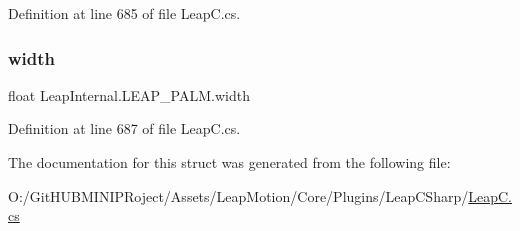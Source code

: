 Definition at line 685 of file Leap\+C.\+cs.

\mbox{\label{struct_leap_internal_1_1_l_e_a_p___p_a_l_m_a47601024191a5adf43568ed45bc9f356}} 
\subsubsection{\texorpdfstring{width}{width}}
{\footnotesize\ttfamily float Leap\+Internal.\+L\+E\+A\+P\+\_\+\+P\+A\+L\+M.\+width}



Definition at line 687 of file Leap\+C.\+cs.



The documentation for this struct was generated from the following file\+:\begin{DoxyCompactItemize}
\item 
O\+:/\+Git\+H\+U\+B\+M\+I\+N\+I\+P\+Roject/\+Assets/\+Leap\+Motion/\+Core/\+Plugins/\+Leap\+C\+Sharp/\mbox{\hyperlink{_leap_c_8cs}{Leap\+C.\+cs}}\end{DoxyCompactItemize}
